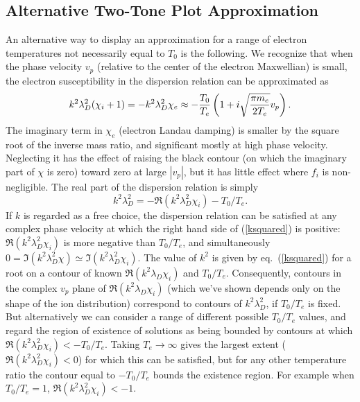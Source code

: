 \documentclass[12pt]{article}
\begin{document}
\subsection{Alternative Two-Tone Plot Approximation}
An alternative way to display an approximation for a range of electron
temperatures not necessarily equal to $T_0$ is the following.  We
recognize that when the phase velocity $v_p$ (relative to the center
of the electron Maxwellian) is small, the electron susceptibility in
the dispersion relation can be approximated as
\begin{equation}
  \label{dispersion}
   k^2\lambda_D^2(\chi_i+1) = - k^2\lambda_D^2\chi_e
\approx - {T_0\over T_e}\left(1+i \sqrt{\pi m_e\over
    2 T_e}v_p\right).
\end{equation}
The imaginary term in $\chi_e$ (electron Landau
damping) is smaller by the square root of the inverse mass ratio, and
significant mostly at high phase velocity. Neglecting it has the
effect of raising the black contour (on which the imaginary part of
$\chi$ is zero) toward zero at large $|v_p|$, but it has little effect
where $f_i$ is non-negligible. The real part of the dispersion
relation is simply 
\begin{equation}
  \label{ksquared}
  k^2\lambda_D^2 = -\Re(k^2\lambda_D^2\chi_i )-T_0/T_e.
\end{equation}
If $k$ is regarded as a free choice, the dispersion relation can be
satisfied at any complex phase velocity at which the right hand side
of (\ref{ksquared}) is positive: $\Re(k^2\lambda_D^2\chi_i)$ is more
negative than $T_0/T_e$, and simultaneously
$0=\Im(k^2\lambda_D^2\chi)\simeq\Im(k^2\lambda_D^2\chi_i )$. The value
of $k^2$ is given by eq.\ (\ref{ksquared}) for a root on a contour of
known $\Re(k^2\lambda_D\chi_i)$ and $T_0/T_e$.  Consequently, contours
in the complex $v_p$ plane of $\Re(k^2\lambda_D\chi_i)$ (which we've
shown depends only on the shape of the ion distribution) correspond to
contours of $k^2\lambda_D^2$, if $T_0/T_e$ is fixed. But alternatively
we can consider a range of different possible $T_0/T_e$ values, and
regard the region of existence of solutions as being bounded by
contours at which $\Re(k^2\lambda_D^2\chi_i)<-T_0/T_e$. Taking
$T_e\to \infty$ gives the largest extent
($\Re(k^2\lambda_D^2\chi_i)<0$) for which this can be satisfied, but
for any other temperature ratio the contour equal to $-T_0/T_e$ bounds
the existence region. For example when $T_0/T_e=1$, $\Re(k^2\lambda_D^2\chi_i)<-1$.
\end{document}
